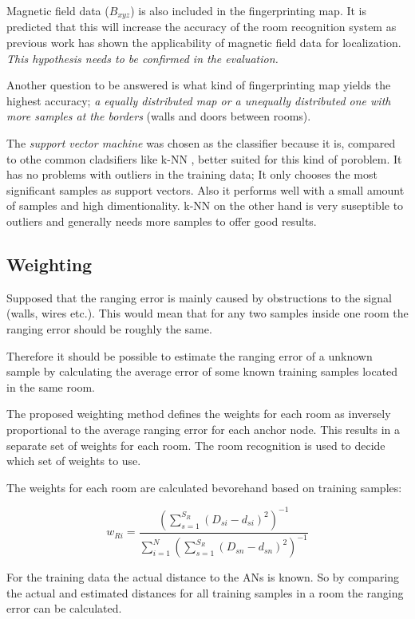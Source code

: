 Magnetic field data ($B_{xyz}$) is also included in the fingerprinting map. It is predicted that this will increase the accuracy of the room recognition system as previous work has shown the applicability of  magnetic field data for localization. \emph{This hypothesis needs to be confirmed in the evaluation.}

Another question to be answered is what kind of fingerprinting map yields the highest accuracy; \emph{a equally distributed map or a unequally distributed one with more samples at the borders }(walls and doors between rooms).

The \emph{support vector machine} was chosen as the classifier because it is, compared to othe common cladsifiers like k-NN , better suited for this kind of poroblem. It has no problems with outliers in the training data; It only chooses the most significant samples as support vectors. Also it performs well with a small amount of samples and high dimentionality. k-NN on the other hand is very suseptible to outliers and generally needs more samples to offer good results.

\subsection{Weighting}

Supposed that the ranging error is mainly caused by obstructions to the signal (walls, wires etc.). This would mean that for any two samples inside one room the ranging error should be roughly the same.

Therefore it should be possible to estimate the ranging error of a unknown sample by calculating the average error of some known training samples located in the same room.

The proposed weighting method defines the weights for each room as inversely proportional to the average ranging error for each anchor node. This results in a separate set of weights for each room. The room recognition is used to decide which set of weights to use.

The weights for each room are calculated bevorehand based on training samples:

\begin{equation}
w_{Ri}=\frac{(\sum_{s=1}^{S_R}{(D_{si}-d_{si})^2})^{-1}}{\sum_{i=1}^{N}{(\sum_{s=1}^{S_R}{(D_{sn}-d_{sn})^2})^{-1}}}
\end{equation}

For the training data the actual distance to the ANs is known. So by comparing the actual and estimated distances for all training samples in a room the ranging error can be calculated.


